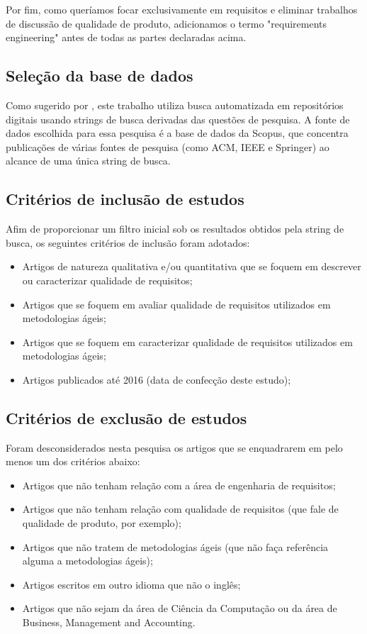 Por fim, como queríamos focar exclusivamente em requisitos e eliminar trabalhos de discussão de qualidade de produto, adicionamos o termo "requirements engineering" antes de todas as partes declaradas acima.

\subsection{Seleção da base de dados}

Como sugerido por \cite{Kitchenham_2015_Evidence_Based_Software_Engineering_and_Systematic_Reviews}, este trabalho utiliza busca automatizada em repositórios digitais usando strings de busca derivadas das questões de pesquisa. A fonte de dados escolhida para essa pesquisa é a base de dados da Scopus, que concentra publicações de várias fontes de pesquisa (como ACM, IEEE e Springer) ao alcance de uma única string de busca.

\subsection{Critérios de inclusão de estudos}

Afim de proporcionar um filtro inicial sob os resultados obtidos pela string de busca, os seguintes critérios de inclusão foram adotados:

\begin{itemize}[noitemsep,nolistsep]
    \item Artigos de natureza qualitativa e/ou quantitativa que se foquem em descrever ou caracterizar qualidade de requisitos;
    \item Artigos que se foquem em avaliar qualidade de requisitos utilizados em metodologias ágeis;
    \item Artigos que se foquem em caracterizar qualidade de requisitos utilizados em metodologias ágeis;
    \item Artigos publicados até 2016 (data de confecção deste estudo);
\end{itemize}

\subsection{Critérios de exclusão de estudos}

Foram desconsiderados nesta pesquisa os artigos que se enquadrarem em pelo menos um dos critérios abaixo:

\begin{itemize}[noitemsep,nolistsep]
    \item Artigos que não tenham relação com a área de engenharia de requisitos;
    \item Artigos que não tenham relação com qualidade de requisitos (que fale de qualidade de produto, por exemplo);
    \item Artigos que não tratem de metodologias ágeis (que não faça referência alguma a metodologias ágeis);
    \item Artigos escritos em outro idioma que não o inglês;
    \item Artigos que não sejam da área de Ciência da Computação ou da área de Business, Management and Accounting.
\end{itemize}

